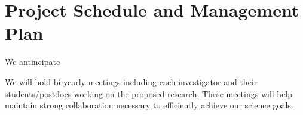 \section{Project Schedule and Management Plan}

We antincipate 

We will  hold bi-yearly meetings including each investigator and their students/postdocs working on the proposed research. These meetings will help maintain strong collaboration necessary to efficiently achieve our science goals.
